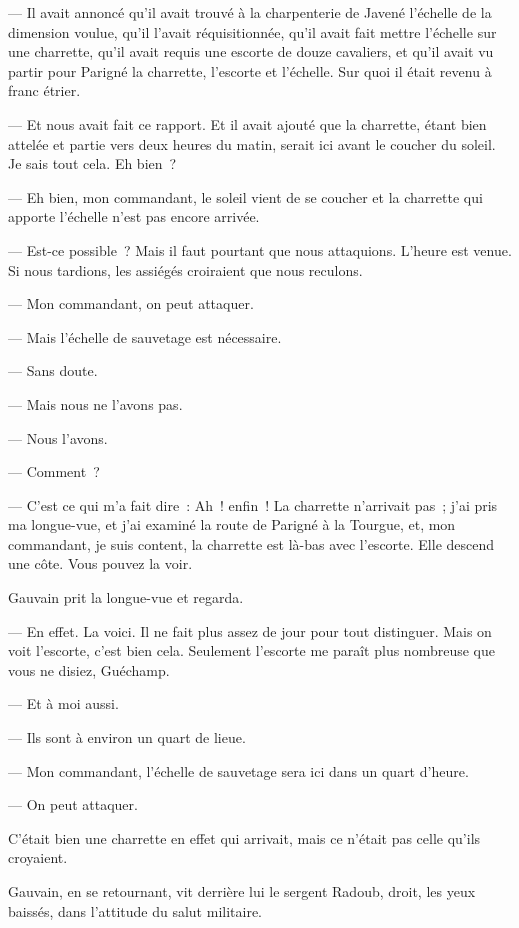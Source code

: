 \documentclass[french,twoside]{book} %
\begin{document}
— Il avait annoncé qu’il avait trouvé à la charpenterie de Javené l’échelle de la dimension voulue, qu’il l’avait réquisitionnée, qu’il avait fait mettre l’échelle sur une charrette, qu’il avait requis une escorte de douze cavaliers, et qu’il avait vu partir pour Parigné la charrette, l’escorte et l’échelle. Sur quoi il était revenu à franc étrier.\par
— Et nous avait fait ce rapport. Et il avait ajouté que la charrette, étant bien attelée et partie vers deux heures du matin, serait ici avant le coucher du soleil. Je sais tout cela. Eh bien ?\par
— Eh bien, mon commandant, le soleil vient de se coucher et la charrette qui apporte l’échelle n’est pas encore arrivée.\par
 — Est-ce possible ? Mais il faut pourtant que nous attaquions. L’heure est venue. Si nous tardions, les assiégés croiraient que nous reculons.\par
— Mon commandant, on peut attaquer.\par
— Mais l’échelle de sauvetage est nécessaire.\par
— Sans doute.\par
— Mais nous ne l’avons pas.\par
— Nous l’avons.\par
— Comment ?\par
— C’est ce qui m’a fait dire : Ah ! enfin ! La charrette n’arrivait pas ; j’ai pris ma longue-vue, et j’ai examiné la route de Parigné à la Tourgue, et, mon commandant, je suis content, la charrette est là-bas avec l’escorte. Elle descend une côte. Vous pouvez la voir.\par
Gauvain prit la longue-vue et regarda.\par
— En effet. La voici. Il ne fait plus assez de jour pour tout distinguer. Mais on voit l’escorte, c’est bien cela. Seulement l’escorte me paraît plus nombreuse que vous ne disiez, Guéchamp.\par
— Et à moi aussi.\par
— Ils sont à environ un quart de lieue.\par
— Mon commandant, l’échelle de sauvetage sera ici dans un quart d’heure.\par
— On peut attaquer.\par
C’était bien une charrette en effet qui arrivait, mais ce n’était pas celle qu’ils croyaient.\par
Gauvain, en se retournant, vit derrière lui le sergent Radoub, droit, les yeux baissés, dans l’attitude du salut militaire.\par
\end{document}
